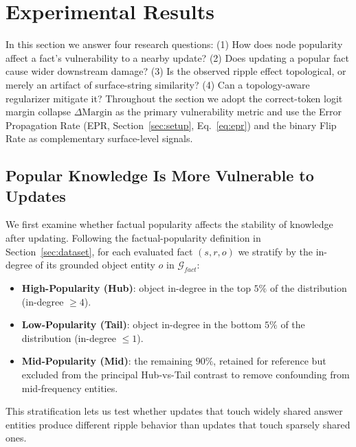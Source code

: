 \section{Experimental Results}
\label{sec:results}

In this section we answer four research questions: (1) How does node popularity affect a fact's vulnerability to a nearby update? (2) Does updating a popular fact cause wider downstream damage? (3) Is the observed ripple effect topological, or merely an artifact of surface-string similarity? (4) Can a topology-aware regularizer mitigate it? Throughout the section we adopt the correct-token logit margin collapse $\Delta\mathrm{Margin}$ as the primary vulnerability metric and use the Error Propagation Rate (EPR, Section~\ref{sec:setup}, Eq.~\ref{eq:epr}) and the binary Flip Rate as complementary surface-level signals.

\subsection{Popular Knowledge Is More Vulnerable to Updates}
\label{subsec:popular_vulnerability}

We first examine whether factual popularity affects the stability of knowledge after updating. Following the factual-popularity definition in Section~\ref{sec:dataset}, for each evaluated fact $(s, r, o)$ we stratify by the in-degree of its grounded object entity $o$ in $\mathcal{G}_{fact}$:
\begin{itemize}
    \setlength\itemsep{0em}
    \item \textbf{High-Popularity (Hub)}: object in-degree in the top $5\%$ of the distribution (in-degree $\ge 4$).
    \item \textbf{Low-Popularity (Tail)}: object in-degree in the bottom $5\%$ of the distribution (in-degree $\le 1$).
    \item \textbf{Mid-Popularity (Mid)}: the remaining $90\%$, retained for reference but excluded from the principal Hub-vs-Tail contrast to remove confounding from mid-frequency entities.
\end{itemize}
This stratification lets us test whether updates that touch widely shared answer entities produce different ripple behavior than updates that touch sparsely shared ones.

